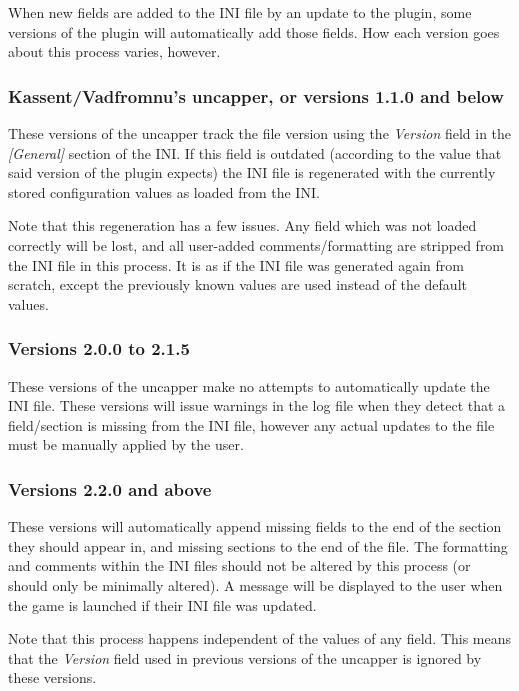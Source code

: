 \documentclass[12pt]{amsart}
\begin{document}
When new fields are added to the INI file by an update to the plugin, some
versions of the plugin will automatically add those fields. How each version
goes about this process varies, however.
\stopblock

\startblock
\subsubsection{Kassent/Vadfromnu's uncapper, or versions 1.1.0 and below}

These versions of the uncapper track the file version using the \textit{Version}
field in the \textit{[General]} section of the INI. If this field is outdated
(according to the value that said version of the plugin expects) the INI file
is regenerated with the currently stored configuration values as loaded from
the INI.

Note that this regeneration has a few issues. Any field which was not loaded
correctly will be lost, and all user-added comments/formatting are stripped
from the INI file in this process. It is as if the INI file was generated again
from scratch, except the previously known values are used instead of the
default values.
\stopblock

\startblock
\subsubsection{Versions 2.0.0 to 2.1.5}

These versions of the uncapper make no attempts to automatically update the INI
file. These versions will issue warnings in the log file when they detect
that a field/section is missing from the INI file, however any actual updates
to the file must be manually applied by the user.
\stopblock

\startblock
\subsubsection{Versions 2.2.0 and above}

These versions will automatically append missing fields to the end of the
section they should appear in, and missing sections to the end of the file.
The formatting and comments within the INI files should not be altered by this
process (or should only be minimally altered). A message will be displayed to
the user when the game is launched if their INI file was updated.

Note that this process happens independent of the values of any field. This
means that the \textit{Version} field used in previous versions of the uncapper
is ignored by these versions.
\stopblock
\end{document}
